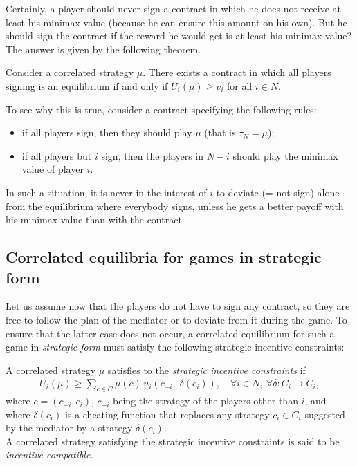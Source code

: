 Certainly, a player should never sign a contract in which he does not receive at least his minimax value (because he can ensure this amount on his own). But he  should sign the contract if the reward he would get is at least his minimax value? The answer is given by the following theorem.

\begin{theorem}
Consider a correlated strategy $\mu$. There exists a contract in which all players signing is an equilibrium if and only if $U_i(\mu) \geq v_i$ for all $i \in N$.
\end{theorem}

\noindent To see why this is true, consider a contract specifying the following rules:
\begin{itemize}
	\renewcommand{\labelitemi}{$\bullet$}
	\item if all players sign, then they should play $\mu$ (that is $\tau_N = \mu$);
	\item if all players but $i$ sign, then the players in $N-i$ should play the minimax value of player $i$.
\end{itemize}
In such a situation, it is never in the interest of $i$ to deviate (= not sign) alone from the equilibrium where everybody signs, unless he gets a better payoff with his minimax value than with the contract.



\subsection{Correlated equilibria for games in strategic form}
\label{ch5:sec:cor}


	
Let us assume now that the players do not have to sign any contract, so they are free to follow the plan of the mediator or to deviate from it during the game. To ensure that the latter case does not occur, a correlated equilibrium for such a game in \emph{strategic form} must satisfy the following strategic incentive constraints:
\begin{definition}
A correlated strategy $\mu$ satisfies to the \emph{strategic incentive constraints} if
\begin{align*}
	U_i(\mu) \geq \sum_{c \in C} \mu(c) \, u_i(c_{-i}, \; \delta(c_i)), \quad \forall i \in N, \ \forall \delta : C_i \rightarrow C_i,
\end{align*}
where $c = (c_{-i}, c_i)$, $c_{-i}$ being the strategy of the players other than $i$, and where $\delta(c_i)$ is a cheating function that replaces any strategy $c_i \in C_i$ suggested by the mediator by a strategy $\delta(c_i)$. \\
A correlated strategy satisfying the strategic incentive constraints is said to be \emph{incentive compatible.}
\label{ch6:def:incentive}
\end{definition}


